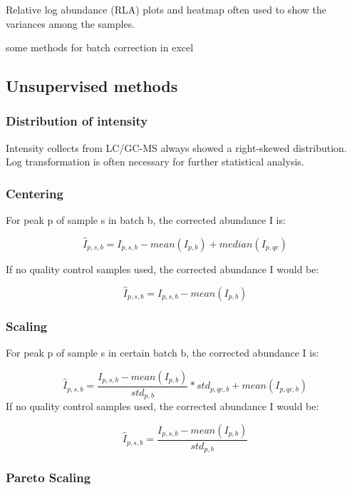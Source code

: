 \documentclass[
]{book}
\begin{document}
Relative log abundance (RLA) plots\citep{delivera2012} and heatmap often used to show the variances among the samples.

\citep{thonusin2017} some methods for batch correction in excel

\hypertarget{unsupervised-methods}{%
\subsection{Unsupervised methods}\label{unsupervised-methods}}

\hypertarget{distribution-of-intensity}{%
\subsubsection{Distribution of intensity}\label{distribution-of-intensity}}

Intensity collects from LC/GC-MS always showed a right-skewed distribution. Log transformation is often necessary for further statistical analysis.

\hypertarget{centering}{%
\subsubsection{Centering}\label{centering}}

For peak p of sample s in batch b, the corrected abundance I is:

\[\hat I_{p,s,b} = I_{p,s,b} - mean(I_{p,b}) + median(I_{p,qc})\]

If no quality control samples used, the corrected abundance I would be:

\[\hat I_{p,s,b} = I_{p,s,b} - mean(I_{p,b})\]

\hypertarget{scaling}{%
\subsubsection{Scaling}\label{scaling}}

For peak p of sample s in certain batch b, the corrected abundance I is:

\[\hat I_{p,s,b} = \frac{I_{p,s,b} - mean(I_{p,b})}{std_{p,b}} * std_{p,qc,b} + mean(I_{p,qc,b})\]
If no quality control samples used, the corrected abundance I would be:

\[\hat I_{p,s,b} = \frac{I_{p,s,b} - mean(I_{p,b})}{std_{p,b}}\]

\hypertarget{pareto-scaling}{%
\subsubsection{Pareto Scaling}\label{pareto-scaling}}
\end{document}
